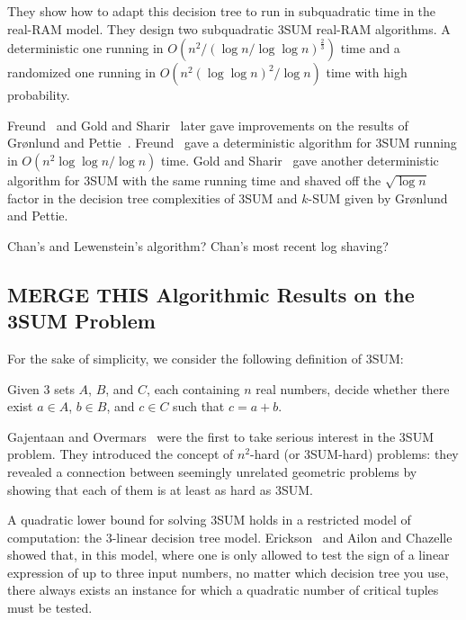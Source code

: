 They show how to adapt this decision tree to run in subquadratic time in the
real-RAM model. They design two subquadratic 3SUM
real-RAM algorithms. A deterministic one running in
$O(n^2/{(\log n/\log \log n)}^{\frac{2}{3}})$
time and a randomized one running in
$O(n^2 {(\log \log n)}^2 / \log n)$ time with high probability.

Freund~\cite{Fr15} and Gold and Sharir~\cite{GS15} later gave improvements on the
results of Gr{\o}nlund and Pettie~\cite{GP18}. Freund~\cite{Fr15} gave a deterministic algorithm for
3SUM running in \(O( {n^2\log \log n}/{\log n})\) time.
Gold and Sharir~\cite{GS15} gave another deterministic algorithm for 3SUM
with the same running time and shaved off the $\sqrt{\log n}$ factor in the
decision tree complexities of 3SUM and \(k\)-SUM given by Gr{\o}nlund and Pettie.

Chan's and Lewenstein's algorithm? Chan's most recent log shaving?

\subsection{MERGE THIS Algorithmic Results on the 3SUM Problem}
For the sake of simplicity, we consider the following definition of 3SUM\@:
\begin{problem}[3SUM]
Given 3 sets $A$, $B$, and $C$, each containing $n$ real numbers, decide
whether there exist $a \in A$, $b \in B$, and $c \in C$ such that $c=a+b$.
\end{problem}

Gajentaan and Overmars~\cite{GO95} were the first to take serious interest in
the 3SUM problem. They introduced the concept of \(n^2\)-hard (or
3SUM-hard) problems:
they revealed a connection between seemingly unrelated geometric
problems by showing that each of them is at least as hard as 3SUM.

A quadratic lower bound for solving 3SUM holds in a restricted model of
computation: the $3$-linear decision tree model. Erickson~\cite{Er99a}
and Ailon and Chazelle~\cite{AC05} showed
that, in this model, where one is only allowed to test the sign of a linear
expression of up to three input numbers, no matter which decision tree you
use, there always exists an instance for which a quadratic number of
critical tuples must be tested.


